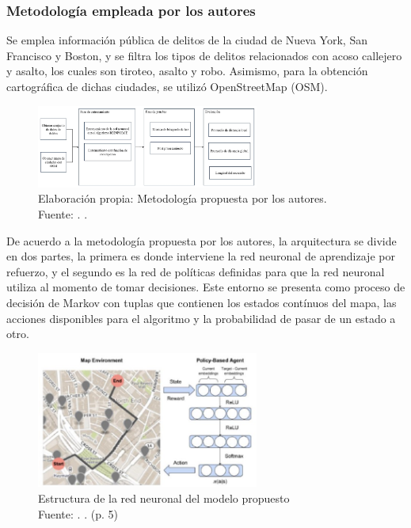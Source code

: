 \subsubsection{Metodología empleada por los autores}
Se emplea información pública de delitos de la ciudad de Nueva York, San Francisco y Boston, y se filtra los tipos de delitos relacionados con acoso callejero y asalto, los cuales son tiroteo, asalto y robo. Asimismo, para la obtención cartográfica de dichas ciudades, se utilizó OpenStreetMap (OSM).

\begin{figure}[h]
	\begin{center}
		\includegraphics[width=0.65\textwidth]{2/figures/SafeMetodo.jpg}
		\caption{Elaboración propia: Metodología propuesta por los autores. \\
			Fuente: \cite{pr_saferoute}. .}
		\label{1:fig2}
	\end{center}
\end{figure}
De acuerdo a la metodología propuesta por los autores, la arquitectura se divide en dos partes, la primera es donde interviene la red neuronal de aprendizaje por refuerzo, y el segundo es la red de políticas definidas para que la red neuronal utiliza al momento de tomar decisiones. Este entorno se presenta como proceso de decisión de Markov con tuplas que contienen los estados contínuos del mapa, las acciones disponibles para el algoritmo y la probabilidad de pasar de un estado a otro.

\begin{figure}[h]
	\begin{center}
		\includegraphics[width=0.65\textwidth]{2/figures/safeRouteAgent.jpg}
		\caption{Estructura de la red neuronal del modelo propuesto \\
			Fuente: \cite{pr_saferoute}. . (p. 5)}
		\label{1:fig2}
	\end{center}
\end{figure}

